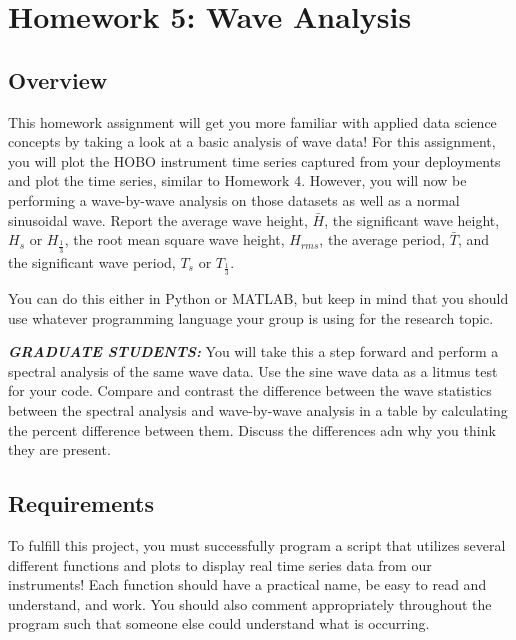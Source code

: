 \documentclass[
	letterpaper, %
	fontsize=10pt, %
	twoside=true, %
	numbers=noenddot, %
]{kaobook}
\begin{document}
\chapter*{Homework 5: Wave Analysis}

\section*{Overview}
This homework assignment will get you more familiar with applied data science concepts by taking a look at a basic analysis of wave data!
For this assignment, you will plot the HOBO instrument time series captured from your deployments and plot the time series, similar to Homework 4.
However, you will now be performing a wave-by-wave analysis on those datasets as well as a normal sinusoidal wave.
Report the average wave height, $\bar{H}$, the significant wave height, $H_s$ or $H_{\frac{1}{3}}$, the root mean square wave height, $H_{rms}$, the average period, $\bar{T}$, and the significant wave period, $T_s$ or $T_{\frac{1}{3}}$.

You can do this either in Python or MATLAB, but keep in mind that you should use whatever programming language your group is using for the research topic. 

\textbf{\emph{GRADUATE STUDENTS:}} You will take this a step forward and perform a spectral analysis of the same wave data. 
Use the sine wave data as a litmus test for your code.
Compare and contrast the difference between the wave statistics between the spectral analysis and wave-by-wave analysis in a table by calculating the percent difference between them.
Discuss the differences adn why you think they are present. 


\section*{Requirements}
To fulfill this project, you must successfully program a script that utilizes several different functions and plots to display real time series data from our instruments!
Each function should have a practical name, be easy to read and understand, and work.
You should also comment appropriately throughout the program such that someone else could understand what is occurring.
\end{document}

